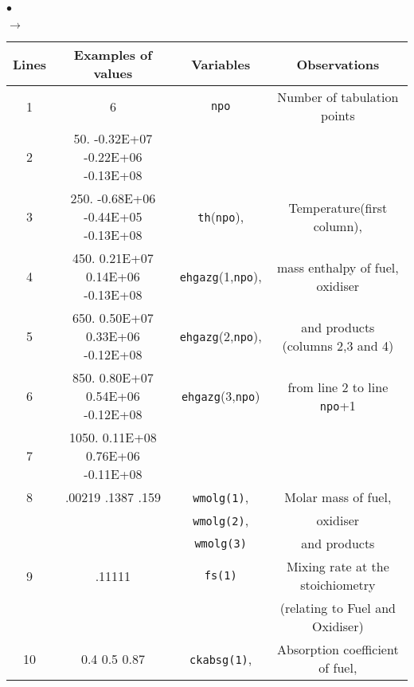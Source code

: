 {{{\begin{list}{$\bullet$}{}
\begin{list}{$\rightarrow$}{}
\begin{table}[htbp]
\begin{center}
\small{
\begin{tabular}{|c|c|c|c|} \hline
 Lines  &            Examples of values     &        Variables            & Observations                                \\ \hline
   1    &                    6              &   \texttt{npo}              & Number of tabulation points                 \\ \hline
   2    &  50. -0.32E+07 -0.22E+06 -0.13E+08&                             &                                             \\
   3    & 250. -0.68E+06 -0.44E+05 -0.13E+08&\texttt{th\index{th}}(\texttt{npo}),           & Temperature(first column),                  \\
   4    & 450.  0.21E+07  0.14E+06 -0.13E+08& \texttt{ehgazg\index{ehgazg}}(1,\texttt{npo}),& mass enthalpy of fuel, oxidiser             \\
   5    & 650.  0.50E+07  0.33E+06 -0.12E+08& \texttt{ehgazg}(2,\texttt{npo}),              & and products (columns 2,3 and 4)            \\
   6    & 850.  0.80E+07  0.54E+06 -0.12E+08& \texttt{ehgazg}(3,\texttt{npo})               & from line 2 to line \texttt{npo}+1                   \\
   7    &1050.  0.11E+08  0.76E+06 -0.11E+08&                             &                                             \\ \hline
   8    & .00219       .1387        .159    &\texttt{wmolg(1)\index{wmolg}},       & Molar mass of fuel,                         \\
        &                                   &                    \texttt{wmolg(2)},& oxidiser                                    \\
        &                                   &                    \texttt{wmolg(3)} & and products                                \\ \hline
   9    &                .11111             &          \texttt{fs(1)\index{fs(1)}} & Mixing rate at the stoichiometry            \\
        &                                   &                             & (relating to Fuel and Oxidiser)             \\ \hline
  10    &    0.4      0.5       0.87        &\texttt{ckabsg\index{ckabsg}(1)},     & Absorption coefficient of fuel,             \\

\end{tabular}}
\end{center}
\end{table}
\end{list}
\end{list}}}}
